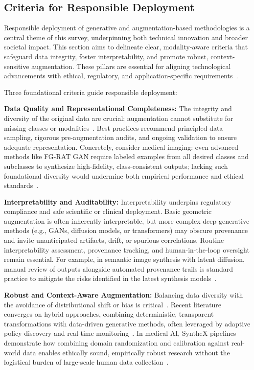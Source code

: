 \documentclass[sigconf]{acmart}
\begin{document}
\subsection{Criteria for Responsible Deployment}

Responsible deployment of generative and augmentation-based methodologies is a central theme of this survey, underpinning both technical innovation and broader societal impact. This section aims to delineate clear, modality-aware criteria that safeguard data integrity, foster interpretability, and promote robust, context-sensitive augmentation. These pillars are essential for aligning technological advancements with ethical, regulatory, and application-specific requirements~\cite{ref61,ref62,ref64,ref65,ref101,ref102}. 

Three foundational criteria guide responsible deployment:

\textbf{Data Quality and Representational Completeness:} The integrity and diversity of the original data are crucial; augmentation cannot substitute for missing classes or modalities~\cite{ref62,ref65,ref101}. Best practices recommend principled data sampling, rigorous pre-augmentation audits, and ongoing validation to ensure adequate representation. Concretely, consider medical imaging: even advanced methods like FG-RAT GAN require labeled examples from all desired classes and subclasses to synthesize high-fidelity, class-consistent outputs; lacking such foundational diversity would undermine both empirical performance and ethical standards~\cite{ref101,ref102}.

\textbf{Interpretability and Auditability:} Interpretability underpins regulatory compliance and safe scientific or clinical deployment. Basic geometric augmentation is often inherently interpretable, but more complex deep generative methods (e.g., GANs, diffusion models, or transformers) may obscure provenance and invite unanticipated artifacts, drift, or spurious correlations. Routine interpretability assessment, provenance tracking, and human-in-the-loop oversight remain essential. For example, in semantic image synthesis with latent diffusion, manual review of outputs alongside automated provenance trails is standard practice to mitigate the risks identified in the latest synthesis models~\cite{ref101,ref102}.

\textbf{Robust and Context-Aware Augmentation:} Balancing data diversity with the avoidance of distributional shift or bias is critical~\cite{ref65,ref81,ref102}. Recent literature converges on hybrid approaches, combining deterministic, transparent transformations with data-driven generative methods, often leveraged by adaptive policy discovery and real-time monitoring~\cite{ref62,ref101}. In medical AI, SyntheX pipelines demonstrate how combining domain randomization and calibration against real-world data enables ethically sound, empirically robust research without the logistical burden of large-scale human data collection~\cite{ref81,ref87,ref90,ref101}.
\end{document}
